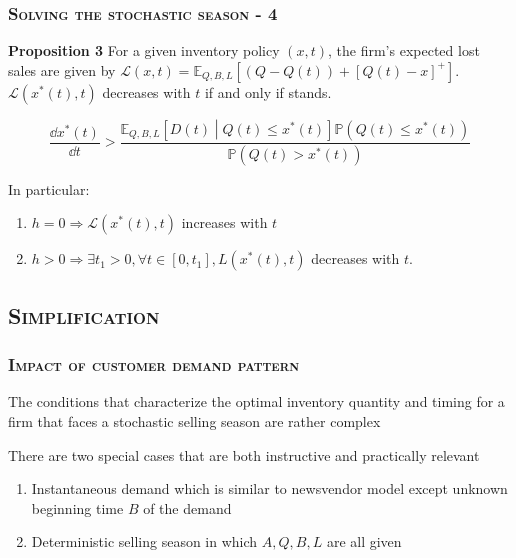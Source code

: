 \documentclass[aspectratio=169]{../presentation}
\begin{document}
    \begin{frame}
        \frametitle{\textsc{Solving the stochastic season - 4}}

        \textrm{\bfseries Proposition 3} For a given inventory policy $(x, t)$, the firm's expected lost sales are given by $\mathcal L(x, t) = \mathbb E_{Q, B, L}\left[(Q - Q(t)) + \left[Q(t) - x\right]^+\right]$. $\mathcal L\left(x^*(t), t\right)$ decreases with $t$ if and only if  stands.

        \begin{equation}
            \frac{\dd x^*(t)}{\dd t} > \frac{\mathbb E_{Q, B, L}\left[D(t)\middle| Q(t)\leq x^*(t)\right]\mathbb P\left(Q(t)\leq x^*(t)\right)}{\mathbb P\left(Q(t) > x^*(t)\right)}
            \label{eq:5}
        \end{equation}

        \pause

        In particular:

        \begin{enumerate}
            \item $h = 0\Rightarrow \mathcal L\left(x^*(t), t\right)$ increases with $t$
            \item $h > 0\Rightarrow \exists t_1 > 0, \forall t\in [0, t_1], L\left(x^*(t), t\right)$ decreases with $t$.
        \end{enumerate}

    \end{frame}

    \subsection{\textsc{Simplification}}

    \begin{frame}
        \frametitle{\textsc{Impact of customer demand pattern}}

        The conditions that characterize the optimal inventory quantity and timing for a firm that faces a stochastic selling season are rather complex

        There are two special cases that are both instructive and practically relevant

        \begin{enumerate}
            \item Instantaneous demand which is similar to newsvendor model except unknown beginning time $B$ of the demand
            \item Deterministic selling season in which $A, Q, B, L$ are all given
        \end{enumerate}

    \end{frame}
\end{document}
